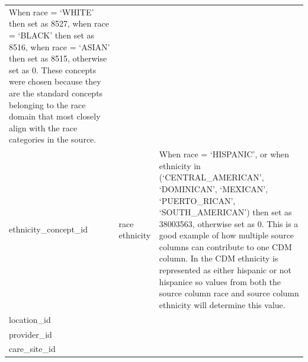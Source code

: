 \documentclass[11pt]{book}
\theoremstyle{definition}
\theoremstyle{definition}
\theoremstyle{definition}
\theoremstyle{remark}
\begin{document}
\begin{longtable}[]{@{}lll@{}}
\begin{minipage}[t]{0.51\columnwidth}
When race = `WHITE' then set as 8527, when race = `BLACK' then set as 8516, when race = `ASIAN' then set as 8515, otherwise set as 0. These concepts were chosen because they are the standard concepts belonging to the race domain that most closely align with the race categories in the source.\strut
\end{minipage}\tabularnewline
\begin{minipage}[t]{0.28\columnwidth}\raggedright
ethnicity\_concept\_id\strut
\end{minipage} & \begin{minipage}[t]{0.12\columnwidth}\raggedright
race ethnicity\strut
\end{minipage} & \begin{minipage}[t]{0.51\columnwidth}\raggedright
When race = `HISPANIC', or when ethnicity in (`CENTRAL\_AMERICAN', `DOMINICAN', `MEXICAN', `PUERTO\_RICAN', `SOUTH\_AMERICAN') then set as 38003563, otherwise set as 0. This is a good example of how multiple source columns can contribute to one CDM column. In the CDM ethnicity is represented as either hispanic or not hispanice so values from both the source column race and source column ethnicity will determine this value.\strut
\end{minipage}\tabularnewline
\begin{minipage}[t]{0.28\columnwidth}\raggedright
location\_id\strut
\end{minipage} & \begin{minipage}[t]{0.12\columnwidth}\raggedright
\strut
\end{minipage} & \begin{minipage}[t]{0.51\columnwidth}\raggedright
\strut
\end{minipage}\tabularnewline
\begin{minipage}[t]{0.28\columnwidth}\raggedright
provider\_id\strut
\end{minipage} & \begin{minipage}[t]{0.12\columnwidth}\raggedright
\strut
\end{minipage} & \begin{minipage}[t]{0.51\columnwidth}\raggedright
\strut
\end{minipage}\tabularnewline
\begin{minipage}[t]{0.28\columnwidth}\raggedright
care\_site\_id\strut
\end{minipage} & \begin{minipage}[t]{0.12\columnwidth}\raggedright
\strut
\end{minipage} & \begin{minipage}[t]{0.51\columnwidth}\raggedright

\end{minipage}
\end{longtable}
\end{document}
